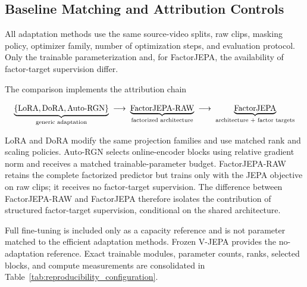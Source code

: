\subsection{Baseline Matching and Attribution Controls}
\label{app:baseline_configuration}

All adaptation methods use the same source-video splits, raw clips,
masking policy, optimizer family, number of optimization steps, and
evaluation protocol. Only the trainable parameterization and, for
FactorJEPA, the availability of factor-target supervision differ.

The comparison implements the attribution chain

\begin{equation*}
\resizebox{0.98\columnwidth}{!}{$\displaystyle
\underbrace{
\{\text{LoRA},\text{DoRA},\text{Auto-RGN}\}
}_{\text{generic adaptation}}
\;\longrightarrow\;
\underbrace{
\text{FactorJEPA-RAW}
}_{\text{factorized architecture}}
\;\longrightarrow\;
\underbrace{
\text{FactorJEPA}
}_{\text{architecture + factor targets}}
$}
\end{equation*}

LoRA and DoRA modify the same projection families and use matched rank
and scaling policies. Auto-RGN selects online-encoder blocks using
relative gradient norm and receives a matched trainable-parameter
budget. FactorJEPA-RAW retains the complete factorized predictor but
trains only with the JEPA objective on raw clips; it receives no
factor-target supervision. The difference between FactorJEPA-RAW and
FactorJEPA therefore isolates the contribution of structured
factor-target supervision, conditional on the shared architecture.

Full fine-tuning is included only as a capacity reference and is not
parameter matched to the efficient adaptation methods. Frozen V-JEPA
provides the no-adaptation reference. Exact trainable modules,
parameter counts, ranks, selected blocks, and compute measurements are
consolidated in Table~\ref{tab:reproducibility_configuration}.








